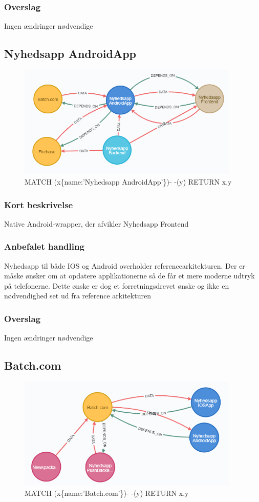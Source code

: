 \documentclass{article}
\begin{document}
\subsubsection{Overslag}
Ingen ændringer nødvendige

\subsection{Nyhedsapp AndroidApp}
\begin{figure}[h]
\includegraphics[width=300pt]{Nyhedsapp-Android.PNG}
\caption{MATCH (x\{name:'Nyhedsapp AndroidApp'\})- -(y) RETURN x,y}
\end{figure}
\subsubsection{Kort beskrivelse}
Native Android-wrapper, der afvikler Nyhedsapp Frontend
\subsubsection{Anbefalet handling}
Nyhedsapp til både IOS og Android overholder referencearkitekturen. Der er måske ønsker om at opdatere applikationerne så de får et mere moderne udtryk på telefonerne. Dette ønske er dog et forretningsdrevet ønske og ikke en nødvendighed set ud fra reference arkitekturen
\subsubsection{Overslag}
Ingen ændringer nødvendige


\subsection{Batch.com}
\begin{figure}[h]
\includegraphics[width=300pt]{Batch-com.PNG}
\caption{MATCH (x\{name:'Batch.com'\})- -(y) RETURN x,y}
\end{figure}
\end{document}
